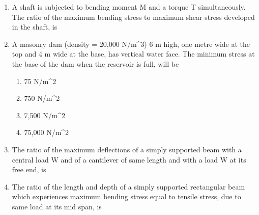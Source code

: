 \documentclass[11pt,a4paper]{article}
\begin{document}
\begin{enumerate}
\begin{enumerate*}[itemjoin=\qquad, label=\Alph*.]
\end{enumerate*}
\item{A shaft is subjected to bending moment M and a torque T simultaneously. The ratio of the maximum bending stress to maximum shear stress developed in the shaft, is}
\\
\item{A masonry dam (density = 20,000 N/m\^{}3) 6 m high, one metre wide at the top and 4 m wide at the base, has vertical water face. The minimum stress at the base of the dam when the reservoir is full, will be}
\begin{enumerate}[label=\Alph*.]
\item{75 N/m\^{}2}
\item{750 N/m\^{}2}
\item{7,500 N/m\^{}2}
\item{75,000 N/m\^{}2}
\end{enumerate}
\item{The ratio of the maximum deflections of a simply supported beam with a central load W and of a cantilever of same length and with a load W at its free end, is}
\\
\item{The ratio of the length and depth of a simply supported rectangular beam which experiences maximum bending stress equal to tensile stress, due to same load at its mid span, is}
\\
\end{enumerate}
\end{document}
